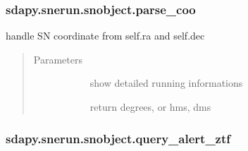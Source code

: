 \documentclass[letterpaper,10pt,english]{sphinxmanual}
\begin{document}
\begin{fulllineitems}
\begin{fulllineitems}
\end{fulllineitems}



\subsubsection{sdapy.snerun.snobject.parse\_coo}
\label{\detokenize{generated/sdapy.snerun.snobject.parse_coo:sdapy-snerun-snobject-parse-coo}}\label{\detokenize{generated/sdapy.snerun.snobject.parse_coo::doc}}

\begin{fulllineitems}
\label{\detokenize{generated/sdapy.snerun.snobject.parse_coo:sdapy.snerun.snobject.parse_coo}}
handle SN coordinate from self.ra and self.dec
\begin{quote}\begin{description}
\item[{Parameters}] \leavevmode\begin{description}
\item[{}] \leavevmode{[}\sphinxtitleref{bool}{]}
show detailed running informations

\item[{}] \leavevmode{[}\sphinxtitleref{bool}{]}
return degrees, or hms, dms

\end{description}

\end{description}\end{quote}

\end{fulllineitems}



\subsubsection{sdapy.snerun.snobject.query\_alert\_ztf}
\label{\detokenize{generated/sdapy.snerun.snobject.query_alert_ztf:sdapy-snerun-snobject-query-alert-ztf}}\label{\detokenize{generated/sdapy.snerun.snobject.query_alert_ztf::doc}}


\end{fulllineitems}
\end{document}
